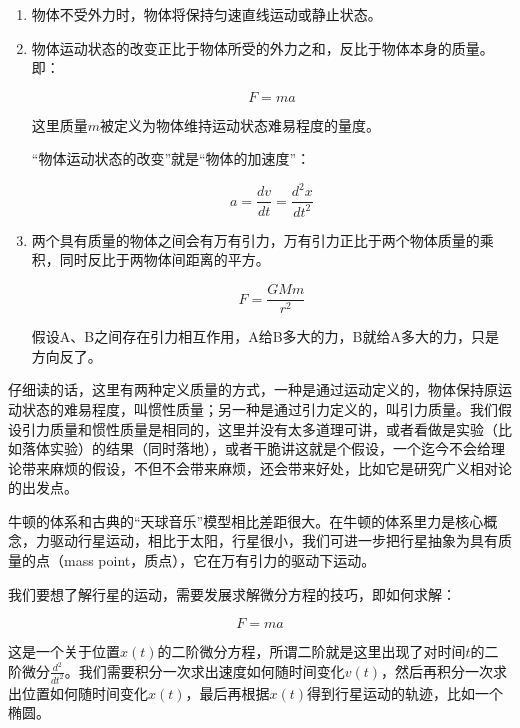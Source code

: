 \begin{enumerate}
\item 

物体不受外力时，物体将保持匀速直线运动或静止状态。

\item

物体运动状态的改变正比于物体所受的外力之和，反比于物体本身的质量。即：

\begin{equation}
F = ma
\end{equation}

这里质量$m$被定义为物体维持运动状态难易程度的量度。

“物体运动状态的改变”就是“物体的加速度”：

\begin{equation}
a = \frac{d v}{d t} = \frac{d^2 x}{d t^2}
\end{equation}

\item

两个具有质量的物体之间会有万有引力，万有引力正比于两个物体质量的乘积，同时反比于两物体间距离的平方。

\begin{equation}
F = \frac{G M m}{r^2}
\end{equation}

假设A、B之间存在引力相互作用，A给B多大的力，B就给A多大的力，只是方向反了。

\end{enumerate}

仔细读的话，这里有两种定义质量的方式，一种是通过运动定义的，物体保持原运动状态的难易程度，叫惯性质量；另一种是通过引力定义的，叫引力质量。我们假设引力质量和惯性质量是相同的，这里并没有太多道理可讲，或者看做是实验（比如落体实验）的结果（同时落地），或者干脆讲这就是个假设，一个迄今不会给理论带来麻烦的假设，不但不会带来麻烦，还会带来好处，比如它是研究广义相对论的出发点。

牛顿的体系和古典的“天球音乐”模型相比差距很大。在牛顿的体系里力是核心概念，力驱动行星运动，相比于太阳，行星很小，我们可进一步把行星抽象为具有质量的点（mass point，质点），它在万有引力的驱动下运动。

我们要想了解行星的运动，需要发展求解微分方程的技巧，即如何求解：

\begin{equation*}
F=ma
\end{equation*}

这是一个关于位置$x(t)$的二阶微分方程，所谓二阶就是这里出现了对时间$t$的二阶微分$\frac{d^2 }{ dt^2 }$。我们需要积分一次求出速度如何随时间变化$v(t)$，然后再积分一次求出位置如何随时间变化$x(t)$，最后再根据$x(t)$得到行星运动的轨迹，比如一个椭圆。

